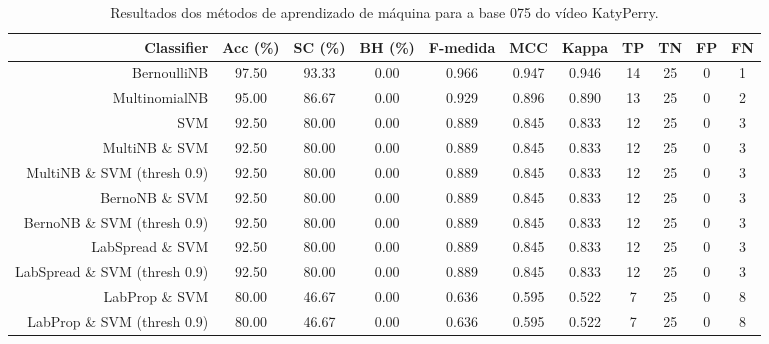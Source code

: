 \begin{table}[!htb]
\centering
\caption{Resultados dos métodos de aprendizado de máquina para a base 075 do vídeo KatyPerry.}
\label{tab:KatyPerry-075}
\begin{tabular}{r|c|c|c|c|c|c|c|c|c|c}
\hline\hline
Classifier & Acc (\%) & SC (\%) & BH (\%) & F-medida & MCC & Kappa & TP & TN & FP & FN \\ \hline
BernoulliNB & 97.50 & 93.33 & 0.00 & 0.966 & 0.947 & 0.946 & 14 & 25 & 0 & 1 \\ 
MultinomialNB & 95.00 & 86.67 & 0.00 & 0.929 & 0.896 & 0.890 & 13 & 25 & 0 & 2 \\ 
SVM & 92.50 & 80.00 & 0.00 & 0.889 & 0.845 & 0.833 & 12 & 25 & 0 & 3 \\ 
MultiNB \& SVM & 92.50 & 80.00 & 0.00 & 0.889 & 0.845 & 0.833 & 12 & 25 & 0 & 3 \\ 
MultiNB \& SVM (thresh 0.9) & 92.50 & 80.00 & 0.00 & 0.889 & 0.845 & 0.833 & 12 & 25 & 0 & 3 \\ 
BernoNB \& SVM & 92.50 & 80.00 & 0.00 & 0.889 & 0.845 & 0.833 & 12 & 25 & 0 & 3 \\ 
BernoNB \& SVM (thresh 0.9) & 92.50 & 80.00 & 0.00 & 0.889 & 0.845 & 0.833 & 12 & 25 & 0 & 3 \\ 
LabSpread \& SVM & 92.50 & 80.00 & 0.00 & 0.889 & 0.845 & 0.833 & 12 & 25 & 0 & 3 \\ 
LabSpread \& SVM (thresh 0.9) & 92.50 & 80.00 & 0.00 & 0.889 & 0.845 & 0.833 & 12 & 25 & 0 & 3 \\ 
LabProp \& SVM & 80.00 & 46.67 & 0.00 & 0.636 & 0.595 & 0.522 & 7 & 25 & 0 & 8 \\ 
LabProp \& SVM (thresh 0.9) & 80.00 & 46.67 & 0.00 & 0.636 & 0.595 & 0.522 & 7 & 25 & 0 & 8 \\ 
\hline\hline
\end{tabular}
\end{table}
